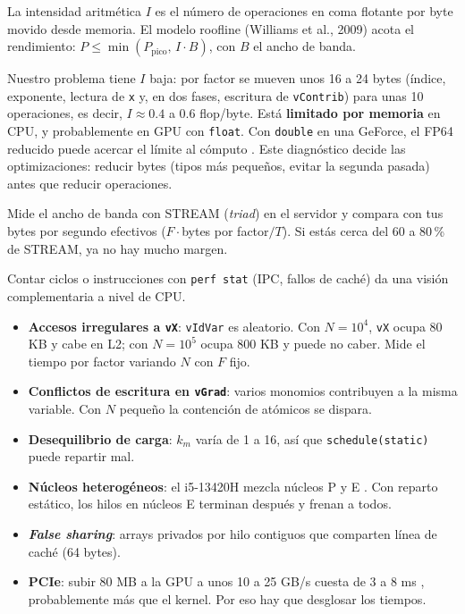 \que La intensidad aritmética $I$ es el número de operaciones en coma flotante por byte movido desde memoria. El modelo roofline (Williams et al., 2009) acota el rendimiento: $P\le\min(P_{\text{pico}},\,I\cdot B)$, con $B$ el ancho de banda.

\porque Nuestro problema tiene $I$ baja: por factor se mueven unos 16 a 24 bytes (índice, exponente, lectura de \texttt{x} y, en dos fases, escritura de \texttt{vContrib}) para unas 10 operaciones, es decir, $I\approx0.4$ a $0.6$ flop/byte. Está \textbf{limitado por memoria} en CPU, y probablemente en GPU con \texttt{float}. Con \texttt{double} en una GeForce, el FP64 reducido puede acercar el límite al cómputo \pv. Este diagnóstico decide las optimizaciones: reducir bytes (tipos más pequeños, evitar la segunda pasada) antes que reducir operaciones.

\como Mide el ancho de banda con STREAM (\emph{triad}) en el servidor y compara con tus bytes por segundo efectivos ($F\cdot$bytes por factor$/T$). Si estás cerca del 60 a 80\,\% de STREAM, ya no hay mucho margen.

\alt Contar ciclos o instrucciones con \texttt{perf stat} (IPC, fallos de caché) da una visión complementaria a nivel de CPU.

\begin{itemize}
\item \textbf{Accesos irregulares a \texttt{vX}}: \texttt{vIdVar} es aleatorio. Con $N=10^4$, \texttt{vX} ocupa 80 KB y cabe en L2; con $N=10^5$ ocupa 800 KB y puede no caber. Mide el tiempo por factor variando $N$ con $F$ fijo.
\item \textbf{Conflictos de escritura en \texttt{vGrad}}: varios monomios contribuyen a la misma variable. Con $N$ pequeño la contención de atómicos se dispara.
\item \textbf{Desequilibrio de carga}: $k_m$ varía de 1 a 16, así que \texttt{schedule(static)} puede repartir mal.
\item \textbf{Núcleos heterogéneos}: el i5-13420H mezcla núcleos P y E \pv. Con reparto estático, los hilos en núcleos E terminan después y frenan a todos.
\item \textbf{\emph{False sharing}}: arrays privados por hilo contiguos que comparten línea de caché (64 bytes).
\item \textbf{PCIe}: subir 80 MB a la GPU a unos 10 a 25 GB/s cuesta de 3 a 8 ms \pv, probablemente más que el kernel. Por eso hay que desglosar los tiempos.
\end{itemize}

